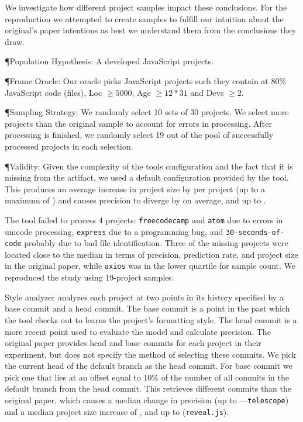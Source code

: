 \documentclass[sigconf,review,anonymous]{acmart}
\begin{document}
We investigate how different project samples impact these conclusions. For the
reproduction we attempted to create samples to fulfill our intuition about the
original's paper intentions as best we understand them from the conclusions they
draw.

\P{Population Hypothesis:} A developed JavaScript projects.

\P{Frame Oracle:} Our oracle picks JavaScript projects such they contain at 80\%
JavaScript code (files), Loc $\geq 5000$, Age $\geq 12*31$ and Devs $\geq 2$.

\P{Sampling Strategy:} We randomly select 10 sets of 30 projects. We select more
projects than the original sample to account for errors in processing. After
processing is finished, we randomly select 19 out of the pool of successfully
processed projects in each selection.

\P{Validity:} Given the complexity of the tools configuration and the fact that
it is missing from the artifact, we used a default configuration provided by the
tool. This produces an average increase in project size by
\SAMeanSupportDeltaPaperVOriginal per project (up to a maximum of
\SAMaxSupportDeltaPaperVOriginal) and causes precision to diverge by
\SAMeanPrecisionDeltaPaperVOriginal on average, and up to
\SAMaxPrecisionDeltaPaperVOriginal.

The tool failed to process 4 projects: \texttt{freecodecamp} and \texttt{atom}
due to errors in unicode processing, \texttt{express} due to a programming bug,
and \texttt{30-seconds-of-code} probably due to bad file identification. Three
of the missing projects were located close to the median in terms of precision,
prediction rate, and project size in the original paper, while \texttt{axios}
was in the lower quartile for sample count. We reproduced the study using
19-project samples.


Style analyzer analyzes each project at two points in its history specified by a
base commit and a head commit. The base commit is a point in the past which the
tool checks out to learns the project's formatting style. The head commit is a
more recent point used to evaluate the model and calculate precision. The
original paper provides head and base commits for each project in their
experiment, but does not specify the method of selecting these commits. We pick
the current head of the default branch as the head commit. For base commit we
pick one that lies at an offset equal to 10\% of the number of all commits in
the default branch from the head commit. This retrieves different commits than
the original paper, which causes a \SAMeanPrecisionDeltaOriginalVRepro median
change in precision (up to
\SAMaxPrecisionDeltaOriginalVRepro---\texttt{telescope}) and a median project
size increase of \SAMeanSupportDeltaOriginalVRepro, and up to
\SAMaxSupportDeltaOriginalVRepro (\texttt{reveal.js}).
\end{document}
